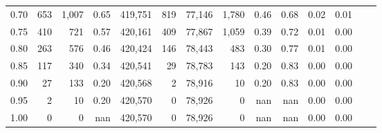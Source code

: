 \begin{tabular}{rrrrrrrrrrrrrr}
0.70 &      653 &   1,007 &    0.65 &  419,751 &      819 &  77,146 &   1,780 &  0.46 &  0.68 &  0.02 &      0.01 \\
0.75 &      410 &     721 &    0.57 &  420,161 &      409 &  77,867 &   1,059 &  0.39 &  0.72 &  0.01 &      0.00 \\
0.80 &      263 &     576 &    0.46 &  420,424 &      146 &  78,443 &     483 &  0.30 &  0.77 &  0.01 &      0.00 \\
0.85 &      117 &     340 &    0.34 &  420,541 &       29 &  78,783 &     143 &  0.20 &  0.83 &  0.00 &      0.00 \\
0.90 &       27 &     133 &    0.20 &  420,568 &        2 &  78,916 &      10 &  0.20 &  0.83 &  0.00 &      0.00 \\
0.95 &        2 &      10 &    0.20 &  420,570 &        0 &  78,926 &       0 &   nan &   nan &  0.00 &      0.00 \\
1.00 &        0 &       0 &     nan &  420,570 &        0 &  78,926 &       0 &   nan &   nan &  0.00 &      0.00 \\
\bottomrule
\end{tabular}
